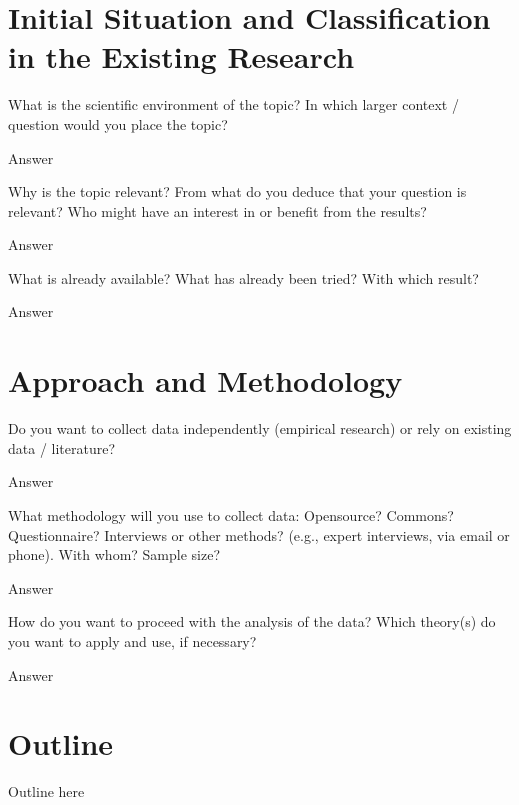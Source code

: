 \section{Initial Situation and Classification in the Existing Research}
What is the scientific environment of the topic? In which larger context / question would you place the topic?

Answer

Why is the topic relevant? From what do you deduce that your question is relevant? Who might have an interest in or benefit from the results?

Answer

What is already available? What has already been tried? With which result?

Answer
\section{Approach and Methodology}
Do you want to collect data independently (empirical research) or rely on existing data / literature?

Answer

What methodology will you use to collect data: Opensource? Commons? Questionnaire? Interviews or other methods? (e.g., expert interviews, via email or phone). With whom? Sample size?

Answer

How do you want to proceed with the analysis of the data? Which theory(s) do you want to apply and use, if necessary?

Answer
\section{Outline}
Outline here